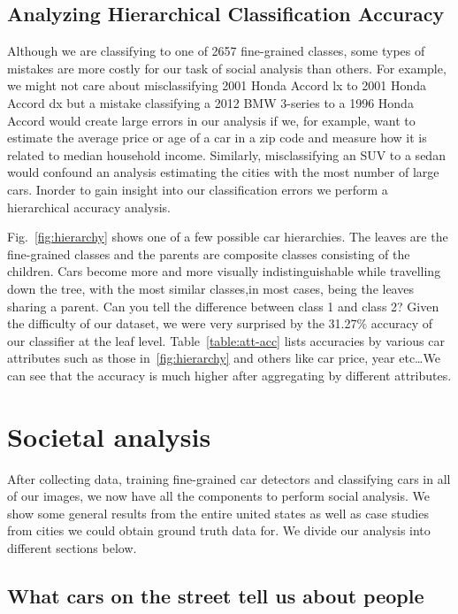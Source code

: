 \documentclass[10pt,twocolumn,letterpaper]{article}
\begin{document}
\subsection{Analyzing Hierarchical Classification Accuracy}
Although we are classifying to one of 2657 fine-grained classes, some types of mistakes are more costly for our task of social analysis than others. For example, we might not care about misclassifying 2001 Honda Accord lx to 2001 Honda Accord dx but a mistake classifying a 2012 BMW 3-series to a 1996 Honda Accord would create large errors in our analysis if we, for example, want to estimate the average price or age of a car in a zip code and measure how it is related to median household income. Similarly, misclassifying an SUV to a sedan would confound an analysis estimating the cities with the most number of large cars. Inorder to gain insight into our classification errors we perform a hierarchical accuracy analysis. 

Fig.~\ref{fig:hierarchy} shows one of a few possible car hierarchies. The leaves are the fine-grained classes and the parents are composite classes consisting of the children. Cars become more and more visually indistinguishable while travelling down the tree, with the most similar classes,in most cases, being the leaves sharing a parent. Can you tell the difference between class 1 and class 2? Given the difficulty of our dataset, we were very surprised by the 31.27\% accuracy of our classifier at the leaf level. Table~\ref{table:att-acc} lists accuracies by various car attributes such as those in~\ref{fig:hierarchy} and others like car price, year etc\ldots We can see that the accuracy is much higher after aggregating by different attributes. 


\section{Societal analysis}
\label{sec:social}
After collecting data, training fine-grained car detectors and classifying cars in all of our images, we now have all the components to perform social analysis. We show some general results from the entire united states as well as case studies from cities we could obtain ground truth data for. We divide our analysis into different sections below.

\subsection{What cars on the street tell us about people}
\end{document}
